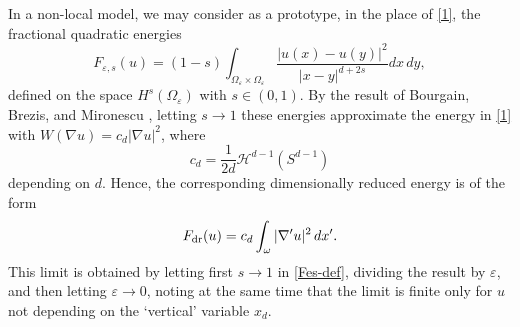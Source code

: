 \documentclass{article}
\newcommand{\e}{\varepsilon}
\begin{document}
In a non-local model, we may consider as a prototype, in the place of \eqref{1}, the fractional quadratic energies 
\begin{equation}\label{Fes-def}
F_{\e,s}(u)=(1-s) \int_{\Omega_\e\times \Omega_\e} \frac{|u(x)-u(y)|^2}{|x-y|^{d+2s}} dx\,dy,
\end{equation}
defined on the space $H^s(\Omega_\e)$ with $s\in(0,1)$.
By the result of Bourgain, Brezis, and Mironescu \cite{BBM}, letting $s\to 1$
these energies approximate the energy in \eqref{1} with $W(\nabla u)=
c_d|\nabla u|^2$, where 
\begin{equation}
c_d=\frac1{2d}\mathcal H^{d-1}(S^{d-1})
\end{equation} depending on $d$. Hence,
the corresponding dimensionally reduced energy is of the form
\begin{equation}\label{c_d}
F_{\rm dr}(u)= c_d\int_\omega |\nabla' u|^2\,dx'.
\end{equation}
This limit is obtained by letting first $s\to 1$ in \eqref{Fes-def}, dividing the result by $\e$, and then letting 
$\e\to 0$, noting at the same time that the limit is finite only for $u$  not depending on
the `vertical' variable $x_d$. 
\end{document}
